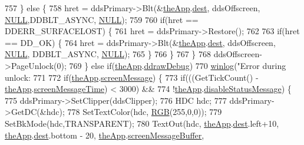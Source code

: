 \begin{DoxyCode}
{{{757     \} \textcolor{keywordflow}{else} \{
758       hret = ddsPrimary->Blt(&\mbox{\hyperlink{_v_b_a_8cpp_a8095a9d06b37a7efe3723f3218ad8fb3}{theApp}}.\mbox{\hyperlink{class_v_b_a_aed77fc82f818810cc87c470768c75e05}{dest}}, ddsOffscreen, \mbox{\hyperlink{getopt1_8c_a070d2ce7b6bb7e5c05602aa8c308d0c4}{NULL}},DDBLT\_ASYNC,
      \mbox{\hyperlink{getopt1_8c_a070d2ce7b6bb7e5c05602aa8c308d0c4}{NULL}});
759       
760       \textcolor{keywordflow}{if}(hret == DDERR\_SURFACELOST) \{
761         hret = ddsPrimary->Restore();
762         
763         \textcolor{keywordflow}{if}(hret == DD\_OK) \{
764           hret = ddsPrimary->Blt(&\mbox{\hyperlink{_v_b_a_8cpp_a8095a9d06b37a7efe3723f3218ad8fb3}{theApp}}.\mbox{\hyperlink{class_v_b_a_aed77fc82f818810cc87c470768c75e05}{dest}}, ddsOffscreen, \mbox{\hyperlink{getopt1_8c_a070d2ce7b6bb7e5c05602aa8c308d0c4}{NULL}}, DDBLT\_ASYNC, 
      \mbox{\hyperlink{getopt1_8c_a070d2ce7b6bb7e5c05602aa8c308d0c4}{NULL}});
765         \}
766       \}
767     \}
768     ddsOffscreen->PageUnlock(0);
769   \} \textcolor{keywordflow}{else} \textcolor{keywordflow}{if}(\mbox{\hyperlink{_v_b_a_8cpp_a8095a9d06b37a7efe3723f3218ad8fb3}{theApp}}.\mbox{\hyperlink{class_v_b_a_a28d611a2c3dfc21191a27e8d8239de35}{ddrawDebug}})
770     \mbox{\hyperlink{_direct_draw_8cpp_aceca31284db939464c9dc0fb15c92786}{winlog}}(\textcolor{stringliteral}{"Error during unlock: %
771 
772   \textcolor{keywordflow}{if}(\mbox{\hyperlink{_v_b_a_8cpp_a8095a9d06b37a7efe3723f3218ad8fb3}{theApp}}.\mbox{\hyperlink{class_v_b_a_a204d14d33aebd442db9affee1cc4f3a8}{screenMessage}}) \{
773     \textcolor{keywordflow}{if}(((GetTickCount() - \mbox{\hyperlink{_v_b_a_8cpp_a8095a9d06b37a7efe3723f3218ad8fb3}{theApp}}.\mbox{\hyperlink{class_v_b_a_a27f8c0f4add5a8242470289874dd601c}{screenMessageTime}}) < 3000) &&
774        !\mbox{\hyperlink{_v_b_a_8cpp_a8095a9d06b37a7efe3723f3218ad8fb3}{theApp}}.\mbox{\hyperlink{class_v_b_a_a7bfea5ab60b19d26053b22ce070e2248}{disableStatusMessage}}) \{
775       ddsPrimary->SetClipper(ddsClipper);
776       HDC hdc;
777       ddsPrimary->GetDC(&hdc);
778       SetTextColor(hdc, \mbox{\hyperlink{bilinear_8cpp_a4a118ad3ee36468a3fa616977a64864e}{RGB}}(255,0,0));
779       SetBkMode(hdc,TRANSPARENT);      
780       TextOut(hdc, \mbox{\hyperlink{_v_b_a_8cpp_a8095a9d06b37a7efe3723f3218ad8fb3}{theApp}}.\mbox{\hyperlink{class_v_b_a_aed77fc82f818810cc87c470768c75e05}{dest}}.left+10, \mbox{\hyperlink{_v_b_a_8cpp_a8095a9d06b37a7efe3723f3218ad8fb3}{theApp}}.\mbox{\hyperlink{class_v_b_a_aed77fc82f818810cc87c470768c75e05}{dest}}.bottom - 20, 
      \mbox{\hyperlink{_v_b_a_8cpp_a8095a9d06b37a7efe3723f3218ad8fb3}{theApp}}.\mbox{\hyperlink{class_v_b_a_ab9551bfe042a30531aeb47a7b2ac2038}{screenMessageBuffer}},
}}}}
\end{DoxyCode}
